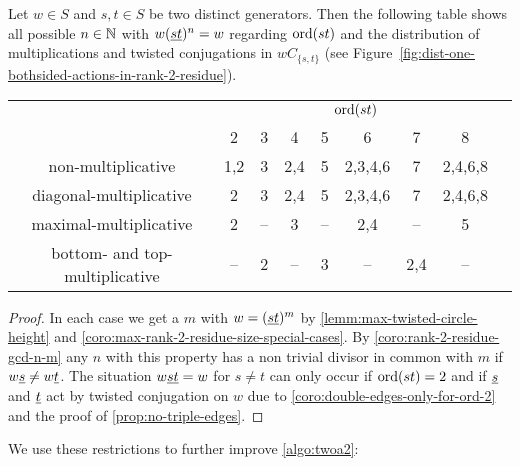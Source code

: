 \begin{coro}
	Let $w \in S$ and $s,t \in S$ be two distinct generators. Then the following table shows all possible $n \in \mathbb{N}$ with $w(\underline{s} \underline{t})^n = w$ regarding $\operatorname{ord}(st)$ and the distribution of multiplications and twisted conjugations in $wC_{\{s,t\}}$ (see Figure~\ref{fig:dist-one-bothsided-actions-in-rank-2-residue}).

	\begin{center}
		\begin{tabular}{c|ccccccc|c}
													& \multicolumn{7}{c|}{$\operatorname{ord}(st)$} \\
													& 2 & 3 & 4 & 5 & 6 & 7 & 8 \\
			\hline
			\textrm{non-multiplicative}				& 1,2 & 3 & 2,4 & 5 & 2,3,4,6 & 7 & 2,4,6,8 \\
			\textrm{diagonal-multiplicative}		& 2 & 3 & 2,4 & 5 & 2,3,4,6 & 7 & 2,4,6,8 \\
			\textrm{maximal-multiplicative}			& 2 & -- & 3 & -- & 2,4 & -- & 5 \\
			\textrm{bottom- and top-multiplicative}	& -- & 2 & -- & 3 & -- & 2,4 & -- \\
		\end{tabular}		
	\end{center}

	\begin{proof}
		In each case we get a $m$ with $w = (\underline{s} \underline{t})^m$ by \ref{lemm:max-twisted-circle-height} and \ref{coro:max-rank-2-residue-size-special-cases}. By \ref{coro:rank-2-residue-gcd-n-m} any $n$ with this property has a non trivial divisor in common with $m$ if $w \underline{s} \neq w \underline{t}$. The situation $w \underline{s} \underline{t} = w$ for $s \neq t$ can only occur if $\operatorname{ord}(st) = 2$ and if $\underline{s}$ and $\underline{t}$ act by twisted conjugation on $w$ due to \ref{coro:double-edges-only-for-ord-2} and the proof of \ref{prop:no-triple-edges}.
	\end{proof}
\end{coro}

We use these restrictions to further improve \ref{algo:twoa2}:

